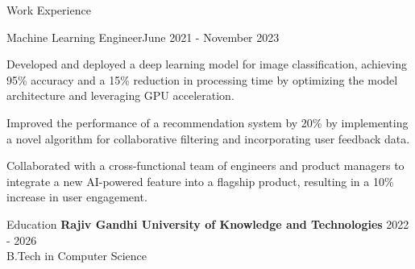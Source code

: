 \documentclass{resume} %
\begin{document}
    \begin{rSection}{Work Experience}
                    \begin{rSubsection}
                {Machine Learning Engineer}{June 2021 - November 2023}
                                    {}
                                {}
                                    \item Developed and deployed a deep learning model for image classification, achieving 95\% accuracy and a 15\% reduction in processing time by optimizing the model architecture and leveraging GPU acceleration.
                                    \item Improved the performance of a recommendation system by 20\% by implementing a novel algorithm for collaborative filtering and incorporating user feedback data.
                                    \item Collaborated with a cross-functional team of engineers and product managers to integrate a new AI-powered feature into a flagship product, resulting in a 10\% increase in user engagement.
                            \end{rSubsection}
            \end{rSection}

\begin{rSection}{Education}
                        \textbf{Rajiv Gandhi University of Knowledge and Technologies} \hfill {2022 - 2026} \\
                            {B.Tech in Computer Science}
                         
             
         
    \end{rSection}
\end{document}
